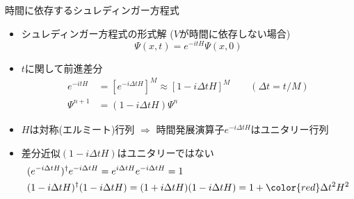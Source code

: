 \begin{frame}[t]{時間に依存するシュレディンガー方程式}
  \begin{itemize}
  \item シュレディンガー方程式の形式解 ($V$が時間に依存しない場合)
    \[
    \Psi(x,t) = e^{-i t H} \Psi(x,0)
    \]
  \item $t$に関して前進差分
    \begin{align*}
      e^{-i t H} &= [e^{-i \Delta t H}]^M \approx [1 - i \Delta t H]^M \qquad (\Delta t = t / M) \\
      \Psi^{n+1} &= (1 -  i \Delta t H) \Psi^{n}
    \end{align*}
  \item $H$は対称(エルミート)行列 $\Rightarrow$ 時間発展演算子$e^{-i \Delta t H}$はユニタリー行列
  \item 差分近似$(1 -  i \Delta t H)$はユニタリーではない
    \begin{align*}
      & (e^{-i \Delta t H})^\dagger e^{-i \Delta t H} = e^{i \Delta t H} e^{-i \Delta t H} = 1 \\
      & (1 -  i \Delta t H)^\dagger (1 -  i \Delta t H) = (1 +  i \Delta t H) (1 -  i \Delta t H) = 1 + {\color{red} \Delta t^2 H^2}
    \end{align*}
  \end{itemize}
\end{frame}
